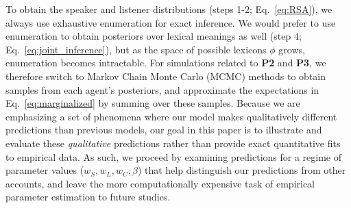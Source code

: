 To obtain the speaker and listener distributions (steps 1-2; Eq.~\ref{eq:RSA}), we always use exhaustive enumeration for exact inference.
We would prefer to use enumeration to obtain posteriors over lexical meanings as well (step 4; Eq.~\ref{eq:joint_inference}), but as the space of possible lexicons $\phi$ grows, enumeration becomes intractable.
For simulations related to \textbf{P2} and \textbf{P3}, we therefore switch to Markov Chain Monte Carlo (MCMC) methods to obtain samples from each agent's posteriors, and approximate the expectations in Eq.~\ref{eq:marginalized} by summing over these samples. 
Because we are emphasizing a set of phenomena where our model makes qualitatively different predictions than previous models, our goal in this paper is to illustrate and evaluate these \emph{qualitative} predictions rather than provide exact quantitative fits to empirical data.
As such, we proceed by examining predictions for a regime of parameter values ($w_S, w_L, w_C,\beta$) that help distinguish our predictions from other accounts, and leave the more computationally expensive task of empirical parameter estimation to future studies.
